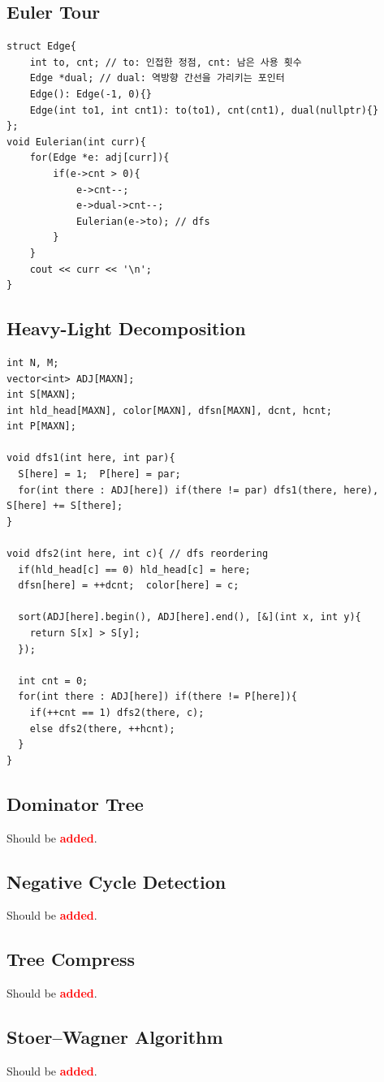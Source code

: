 \documentclass[landscape, 8pt, a4paper, oneside, twocolumn]{extarticle}
\newcommand{\added}{Should be \textcolor{red}{\textbf{added}}.}
\begin{document}
\subsection{Euler Tour}
\begin{verbatim}
struct Edge{
    int to, cnt; // to: 인접한 정점, cnt: 남은 사용 횟수
    Edge *dual; // dual: 역방향 간선을 가리키는 포인터
    Edge(): Edge(-1, 0){}
    Edge(int to1, int cnt1): to(to1), cnt(cnt1), dual(nullptr){}
};
void Eulerian(int curr){
    for(Edge *e: adj[curr]){
        if(e->cnt > 0){
            e->cnt--;
            e->dual->cnt--;
            Eulerian(e->to); // dfs
        }
    }
    cout << curr << '\n';
}
\end{verbatim}
\subsection{Heavy-Light Decomposition}
\begin{verbatim}
int N, M;
vector<int> ADJ[MAXN];
int S[MAXN];
int hld_head[MAXN], color[MAXN], dfsn[MAXN], dcnt, hcnt;
int P[MAXN];

void dfs1(int here, int par){
  S[here] = 1;  P[here] = par;
  for(int there : ADJ[here]) if(there != par) dfs1(there, here), S[here] += S[there];
}

void dfs2(int here, int c){ // dfs reordering
  if(hld_head[c] == 0) hld_head[c] = here;
  dfsn[here] = ++dcnt;  color[here] = c;

  sort(ADJ[here].begin(), ADJ[here].end(), [&](int x, int y){
    return S[x] > S[y];
  });

  int cnt = 0;
  for(int there : ADJ[here]) if(there != P[here]){
    if(++cnt == 1) dfs2(there, c);
    else dfs2(there, ++hcnt);
  }
}
\end{verbatim}
\subsection{Dominator Tree}
\added
\subsection{Negative Cycle Detection}
\added
\subsection{Tree Compress}
\added
\subsection{Stoer–Wagner Algorithm}
\added
\end{document}
